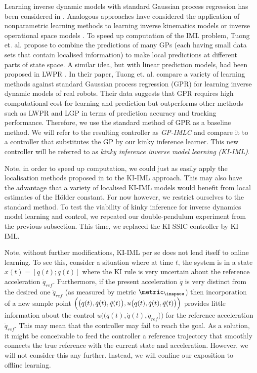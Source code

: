 Learning inverse dynamic models with standard Gaussian process regression has been considered in \cite{GPbook:2006,Chai2008}. Analogous approaches have considered the application of nonparametric learning methods to learning inverse kinematics models \cite{souza2001} or inverse operational space models \cite{Petersoperational2006}.
To speed up computation of the IML problem, 
Tuong et. al. \cite{TuongSeegerPeters2009} propose to combine the predictions of many GPs (each having small data sets that contain localised information) to make local predictions at different parts of state space. 
A similar idea, but with linear prediction models, had been proposed in LWPR \cite{lwpr2000,Schaal2002}.
In their paper, Tuong et. al. \cite{TuongSeegerPeters2009} compare a variety of learning methods against standard Gaussian process regression (GPR) for learning inverse dynamic models of real robots. Their data suggests that GPR requires high computational cost for learning and prediction but outperforms other methods such as LWPR \cite{lwpr2000} and LGP \cite{TuongSeegerPeters2009} in terms of prediction accuracy and tracking performance. 
Therefore, we use the standard method of GPR as a baseline method. We will refer to the resulting controller as \textit{GP-IMLC} and compare it to a controller that substitutes the GP by our kinky inference learner. This new controller will be referred to as \textit{kinky inference inverse model learning (KI-IML)}.

Note, in order to speed up computation, we could just as easily apply the localisation methods proposed in \cite{TuongSeegerPeters2009} to the KI-IML approach. This may also have the advantage that a variety of localised KI-IML models would benefit from local estimates of the H\"older constant.
For now however, we restrict ourselves to the standard method. To test the viability of kinky inference for inverse dynamics model learning and control, we repeated our double-pendulum experiment from the previous subsection. This time, we replaced the KI-SSIC controller by KI-IML. 

Note, without further modifications,  KI-IML per se does not lend itself to online learning. To see this, consider a situation where at time $t$, the system is in a state $x(t) = [q(t);\dot q(t)]$ where the KI rule is very uncertain about the reference acceleration $\ddot q_{ref}$. Furthermore, if the present acceleration $\ddot q$ is very distinct from the desired one $\ddot q_{ref}$ (as measured by metric $\metric_\inspace$) then incorporation of a new sample point $\Bigl( \bigl(q(t), \dot q(t), \ddot q(t)\bigr),u\bigl(q(t), \dot q(t), \ddot q(t)\bigr)\Bigr) $ provides little information about the control $u\bigl((q(t), \dot q(t), \ddot q_{ref} \bigr)  \bigr)$ for the reference acceleration $\ddot q_{ref}$. This may mean that the controller may fail to reach the goal. As a solution, it might be conceivable to feed the controller a reference trajectory that smoothly connects the true reference with the current state and acceleration. However, we will not consider this any further. Instead, we will confine our exposition to offline learning.




